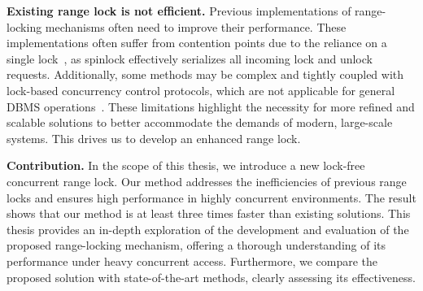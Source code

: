 \textbf{Existing range lock is not efficient.}
Previous implementations of range-locking mechanisms often need to improve their performance. 
These implementations often suffer from contention points due to the reliance on a single lock~\parencite{linuxRangeLockImpl2013, song2013parallelizing}, as spinlock effectively serializes all incoming lock and unlock requests. 
Additionally, some methods may be complex and tightly coupled with lock-based concurrency control protocols, which are not applicable for general DBMS operations~\parencite{graefe2007hierarchical, andy2022database}. 
These limitations highlight the necessity for more refined and scalable solutions to better accommodate the demands of modern, large-scale systems. This drives us to develop an enhanced range lock.

\textbf{Contribution.} In the scope of this thesis, we introduce a new lock-free concurrent range lock. 
Our method addresses the inefficiencies of previous range locks and ensures high performance in highly concurrent environments. 
The result shows that our method is at least three times faster than existing solutions. 
This thesis provides an in-depth exploration of the development and evaluation of the proposed range-locking mechanism, offering a thorough understanding of its performance under heavy concurrent access. 
Furthermore, we compare the proposed solution with state-of-the-art methods, clearly assessing its effectiveness.